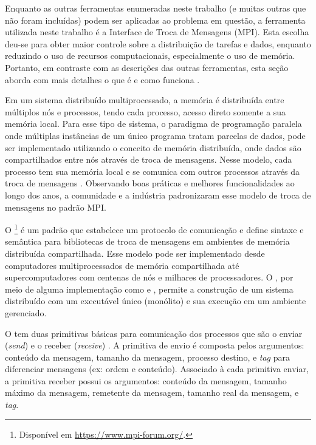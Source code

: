 Enquanto as outras ferramentas enumeradas neste trabalho (e muitas outras que
não foram incluídas) podem ser aplicadas ao problema em questão, a ferramenta
utilizada neste trabalho é a Interface de Troca de Mensagens (MPI).
Esta escolha deu-se para obter maior controle sobre a distribuição de tarefas e
dados, enquanto reduzindo o uso de recursos computacionais, especialmente o uso
de memória.
Portanto, em contraste com as descrições das outras ferramentas, esta seção
aborda com mais detalhes o que é e como funciona \mpi.

Em um sistema distribuído multiprocessado, a memória é distribuída entre
múltiplos nós e processos, tendo cada processo, acesso direto somente a sua memória
local.
Para esse tipo de sistema, o paradigma de programação paralela \spmd onde
múltiplas instâncias de um único programa tratam parcelas de dados, pode ser
implementado utilizando o conceito de memória distribuída, onde dados são
compartilhados entre nós através de troca de mensagens.
Nesse modelo, cada
processo tem sua memória local e se comunica com outros processos através da
troca de mensagens \cite{MpiMitBookGroupp2014}.
Observando boas práticas e melhores funcionalidades ao longo dos anos, a
comunidade e a indústria padronizaram esse modelo de troca de mensagens no
padrão \acf{MPI}.

O \mpi\footnote{Disponível em \url{https://www.mpi-forum.org/}.} é um padrão que
estabelece um protocolo de comunicação e define sintaxe e semântica para
bibliotecas de troca de mensagens em ambientes de memória distribuída compartilhada.
Esse modelo pode ser implementado desde computadores multiprocessados de memória
compartilhada até supercomputadores com centenas de nós e milhares de
processadores.
O \mpi, por meio de alguma implementação como  e
, permite a construção de um sistema distribuído com um
executável único (monólito) e sua execução em um ambiente gerenciado.

O \mpi tem duas primitivas básicas para comunicação dos processos que são o
enviar (\emph{send}) e o receber (\emph{receive}) \cite{MpiMitBookGroupp2014}.
A primitiva de envio é composta pelos argumentos: conteúdo da mensagem, tamanho
da mensagem, processo destino, e \emph{tag} para diferenciar mensagens (ex:
ordem e conteúdo).
Associado à cada primitiva enviar, a primitiva receber possui os argumentos:
conteúdo da mensagem, tamanho máximo da mensagem, remetente da mensagem, tamanho
real da mensagem, e \emph{tag}.

